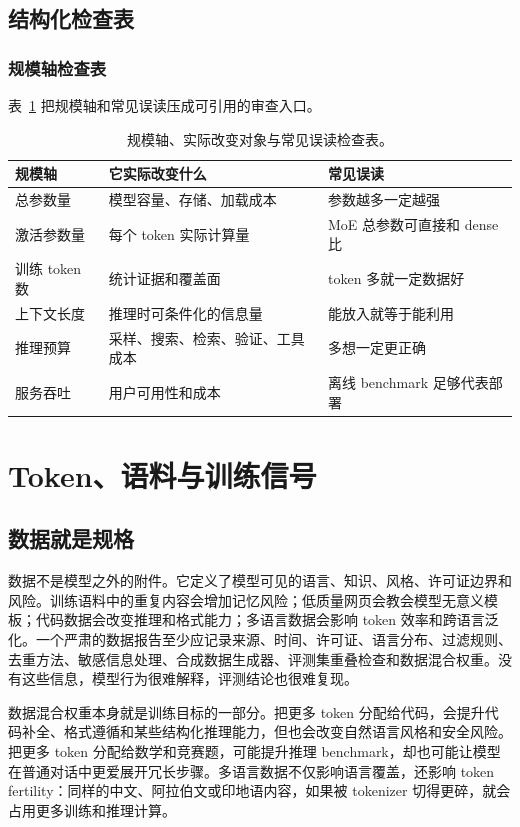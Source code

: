 \documentclass[UTF8,zihao=-4,openany]{ctexbook}
\begin{document}
\section{结构化检查表}
\subsection{规模轴检查表}
表~\ref{tab:zh-scale-axis-checklist} 把规模轴和常见误读压成可引用的审查入口。

\begin{table}[t]
\centering
\begin{tabular}{p{}p{}p{}}
\toprule
规模轴 & 它实际改变什么 & 常见误读 \\
\midrule
总参数量 & 模型容量、存储、加载成本 & 参数越多一定越强 \\
激活参数量 & 每个 token 实际计算量 & MoE 总参数可直接和 dense 比 \\
训练 token 数 & 统计证据和覆盖面 & token 多就一定数据好 \\
上下文长度 & 推理时可条件化的信息量 & 能放入就等于能利用 \\
推理预算 & 采样、搜索、检索、验证、工具成本 & 多想一定更正确 \\
服务吞吐 & 用户可用性和成本 & 离线 benchmark 足够代表部署 \\
\bottomrule
\end{tabular}
\caption{规模轴、实际改变对象与常见误读检查表。}
\label{tab:zh-scale-axis-checklist}
\end{table}

\chapter{Token、语料与训练信号}
\section{数据就是规格}
数据不是模型之外的附件。它定义了模型可见的语言、知识、风格、许可证边界和风险。训练语料中的重复内容会增加记忆风险；低质量网页会教会模型无意义模板；代码数据会改变推理和格式能力；多语言数据会影响 token 效率和跨语言泛化。一个严肃的数据报告至少应记录来源、时间、许可证、语言分布、过滤规则、去重方法、敏感信息处理、合成数据生成器、评测集重叠检查和数据混合权重。没有这些信息，模型行为很难解释，评测结论也很难复现。

数据混合权重本身就是训练目标的一部分。把更多 token 分配给代码，会提升代码补全、格式遵循和某些结构化推理能力，但也会改变自然语言风格和安全风险。把更多 token 分配给数学和竞赛题，可能提升推理 benchmark，却也可能让模型在普通对话中更爱展开冗长步骤。多语言数据不仅影响语言覆盖，还影响 token fertility：同样的中文、阿拉伯文或印地语内容，如果被 tokenizer 切得更碎，就会占用更多训练和推理计算。
\end{document}
